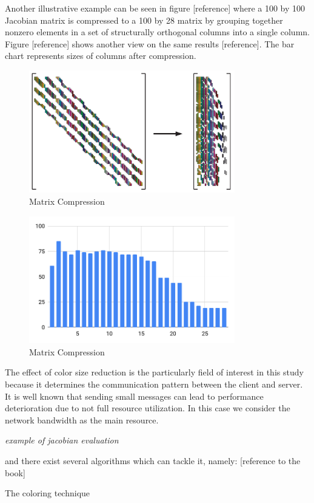 Another illustrative example can be seen in figure [reference] where a 100 by 100 Jacobian matrix is compressed to a 100 by 28 matrix by grouping together nonzero elements in a set of structurally orthogonal columns into a single column. Figure [reference] shows another view on the same results [reference]. The bar chart represents sizes of columns after compression.\par

\begin{figure}[htpb]
  \centering
  \includegraphics[width=0.8\textwidth]{figures/matrix-compression.png}
  \caption{Matrix Compression} \label{fig:applications}
\end{figure}
\par

\begin{figure}[htpb]
  \centering
  \includegraphics[width=0.8\textwidth]{figures/matrix-compression-2.png}
  \caption{Matrix Compression} \label{fig:applications}
\end{figure}
\par



The effect of color size reduction is the particularly field of interest in this study because it determines the communication pattern between the client and server. It is well known that sending small messages can lead to performance deterioration due to not full resource utilization. In this case we consider the network bandwidth as the main resource.

\emph{example of jacobian evaluation}
\par


 

 and there exist several algorithms which can tackle it, namely: [reference to the book]

The coloring technique 